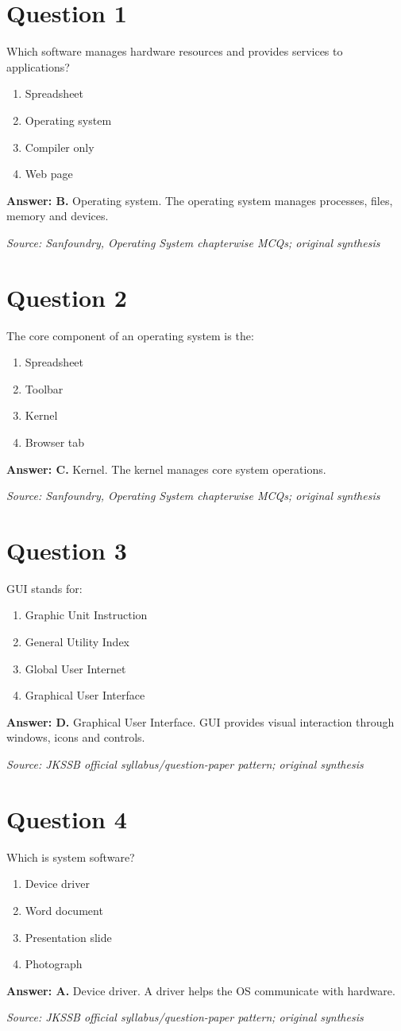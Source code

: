 \documentclass[11pt,a4paper]{book}
\newcommand{\source}[1]{\par\smallskip\textit{Source: #1}}
\newcommand{\answer}[2]{\par\textbf{Answer: #1.} #2}
\begin{document}
\section*{Question 1}
Which software manages hardware resources and provides services to applications?
\begin{enumerate}[label=\Alph*.]
\item Spreadsheet
\item Operating system
\item Compiler only
\item Web page
\end{enumerate}
\answer{B}{Operating system. The operating system manages processes, files, memory and devices.}
\source{Sanfoundry, Operating System chapterwise MCQs; original synthesis}
\section*{Question 2}
The core component of an operating system is the:
\begin{enumerate}[label=\Alph*.]
\item Spreadsheet
\item Toolbar
\item Kernel
\item Browser tab
\end{enumerate}
\answer{C}{Kernel. The kernel manages core system operations.}
\source{Sanfoundry, Operating System chapterwise MCQs; original synthesis}
\section*{Question 3}
GUI stands for:
\begin{enumerate}[label=\Alph*.]
\item Graphic Unit Instruction
\item General Utility Index
\item Global User Internet
\item Graphical User Interface
\end{enumerate}
\answer{D}{Graphical User Interface. GUI provides visual interaction through windows, icons and controls.}
\source{JKSSB official syllabus/question-paper pattern; original synthesis}
\section*{Question 4}
Which is system software?
\begin{enumerate}[label=\Alph*.]
\item Device driver
\item Word document
\item Presentation slide
\item Photograph
\end{enumerate}
\answer{A}{Device driver. A driver helps the OS communicate with hardware.}
\source{JKSSB official syllabus/question-paper pattern; original synthesis}
\end{document}
